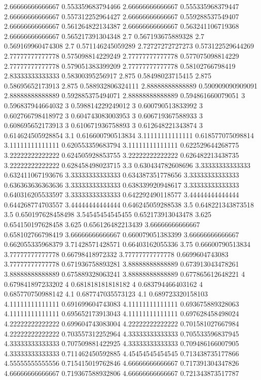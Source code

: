 {2.66666666666667 0.553359683794466
2.66666666666667 0.555335968379447
2.66666666666667 0.557312252964427
2.66666666666667 0.559288537549407
2.66666666666667 0.561264822134387
2.66666666666667 0.563241106719368
2.66666666666667 0.565217391304348
2.7 0.567193675889328
2.7 0.569169960474308
2.7 0.571146245059289
2.72727272727273 0.573122529644269
2.77777777777778 0.575098814229249
2.77777777777778 0.577075098814229
2.77777777777778 0.579051383399209
2.77777777777778 0.58102766798419
2.83333333333333 0.58300395256917
2.875 0.58498023715415
2.875 0.58695652173913
2.875 0.588932806324111
2.88888888888889 0.590909090909091
2.88888888888889 0.592885375494071
2.88888888888889 0.594861660079051
3 0.596837944664032
3 0.598814229249012
3 0.600790513833992
3 0.602766798418972
3 0.604743083003953
3 0.606719367588933
3 0.608695652173913
3 0.610671936758893
3 0.612648221343874
3 0.614624505928854
3.1 0.616600790513834
3.11111111111111 0.618577075098814
3.11111111111111 0.620553359683794
3.11111111111111 0.622529644268775
3.22222222222222 0.624505928853755
3.22222222222222 0.626482213438735
3.22222222222222 0.628458498023715
3.3 0.630434782608696
3.33333333333333 0.632411067193676
3.33333333333333 0.634387351778656
3.33333333333333 0.636363636363636
3.33333333333333 0.638339920948617
3.33333333333333 0.640316205533597
3.33333333333333 0.642292490118577
3.44444444444444 0.644268774703557
3.44444444444444 0.646245059288538
3.5 0.648221343873518
3.5 0.650197628458498
3.54545454545455 0.652173913043478
3.625 0.654150197628458
3.625 0.656126482213439
3.66666666666667 0.658102766798419
3.66666666666667 0.660079051383399
3.66666666666667 0.662055335968379
3.71428571428571 0.66403162055336
3.75 0.66600790513834
3.77777777777778 0.66798418972332
3.77777777777778 0.6699604743083
3.77777777777778 0.671936758893281
3.88888888888889 0.673913043478261
3.88888888888889 0.675889328063241
3.88888888888889 0.677865612648221
4 0.679841897233202
4 0.681818181818182
4 0.683794466403162
4 0.685770750988142
4.1 0.687747035573123
4.1 0.689723320158103
4.11111111111111 0.691699604743083
4.11111111111111 0.693675889328063
4.11111111111111 0.695652173913043
4.11111111111111 0.697628458498024
4.22222222222222 0.699604743083004
4.22222222222222 0.701581027667984
4.22222222222222 0.703557312252964
4.33333333333333 0.705533596837945
4.33333333333333 0.707509881422925
4.33333333333333 0.709486166007905
4.33333333333333 0.711462450592885
4.45454545454545 0.713438735177866
4.55555555555556 0.715415019762846
4.66666666666667 0.717391304347826
4.66666666666667 0.719367588932806
4.66666666666667 0.721343873517787
}
